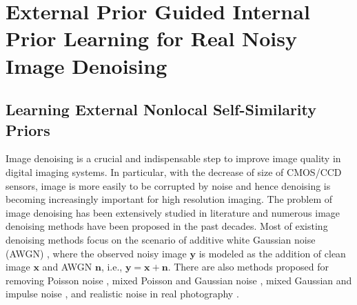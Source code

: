 %
\chapter{External Prior Guided Internal Prior Learning for Real Noisy Image Denoising}
\label{sec:guided}



\section{Learning External Nonlocal Self-Similarity Priors}
\label{sec:system:intro}


Image denoising is a crucial and indispensable step to improve image quality in digital imaging systems. In particular, with the decrease of size of CMOS/CCD sensors, image is more easily to be corrupted by noise and hence denoising is becoming increasingly important for high resolution imaging. The problem of image denoising has been extensively studied in literature and numerous image denoising methods
\cite{bayesshrink,curvelet,ksvd,lssc,ncsr,bm3d,cbm3d,
zhou2012nonparametric,Tomasi1998,blsgsm,nlm,nlbayes,wnnm,pgpd,foe,epll,
mlp,xie2012image,zhang2017beyond,
barbu2009training,csf,chen2015learning,Fadili,salmon2014,
Foipractical,Luisier,Makitalo2013Optimal,Montagner,
jiang2014mixed,Hu2016,xuaccv2016,
fullyblind,rabie2005robust,Liu2008,almapg,noiseclinic,
ncwebsite,Zhu_2016_CVPR,crosschannel2016,neatimage}
have been proposed in the past decades. Most of existing denoising methods focus on the scenario of additive white Gaussian noise (AWGN) 
\cite{bayesshrink,curvelet,ksvd,lssc,ncsr,bm3d,cbm3d,
zhou2012nonparametric,Tomasi1998,blsgsm,nlm,nlbayes,wnnm,pgpd,foe,epll,
mlp,xie2012image,zhang2017beyond,barbu2009training,csf,chen2015learning}, where the observed noisy image $\mathbf{y}$ is modeled as the addition of clean image $\mathbf{x}$ and AWGN $\mathbf{n}$, i.e., $\mathbf{y}=\mathbf{x}+\mathbf{n}$. There are also methods proposed for removing Poisson noise \cite{Fadili,salmon2014}, mixed Poisson and Gaussian noise \cite{Foipractical,Luisier,Makitalo2013Optimal,Montagner}, mixed Gaussian and impulse noise \cite{jiang2014mixed,Hu2016,xuaccv2016}, and realistic noise in real photography \cite{fullyblind,rabie2005robust,Liu2008,almapg,Zhu_2016_CVPR,noiseclinic,
ncwebsite,crosschannel2016,neatimage}.

